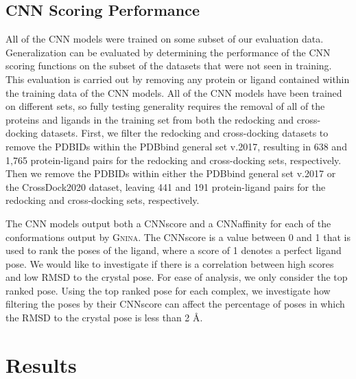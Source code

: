 \documentclass[journal=jcisd8,manuscript=article]{achemso}
\begin{document}
\subsection{CNN Scoring Performance}
All of the CNN models were trained on some subset of our evaluation data. Generalization can be evaluated by determining the performance of the CNN scoring functions on the subset of the datasets that were not seen in training. This evaluation is carried out by removing any protein or ligand contained within the training data of the CNN models. All of the CNN models have been trained on different sets, so fully testing generality requires the removal of all of the proteins and ligands in the training set from both the redocking and cross-docking datasets. First, we filter the redocking and cross-docking datasets to remove the PDBIDs within the PDBbind general set v.2017, resulting in 638 and 1,765 protein-ligand pairs for the redocking and cross-docking sets, respectively. Then we remove the PDBIDs within either the PDBbind general set v.2017 or the CrossDock2020 dataset\cite{francoeur2020three}, leaving 441 and 191 protein-ligand pairs for the redocking and cross-docking sets, respectively. 

The CNN models output both a CNNscore and a CNNaffinity for each of the conformations output by \textsc{Gnina}. The CNNscore is a value between 0 and 1 that is used to rank the poses of the ligand, where a score of 1 denotes a perfect ligand pose. We would like to investigate if there is a correlation between high scores and low RMSD to the crystal pose. For ease of analysis, we only consider the top ranked pose. Using the top ranked pose for each complex, we investigate how filtering the poses by their CNNscore can affect the percentage of poses in which the RMSD to the crystal pose is less than 2 \AA.

\section{Results}
\end{document}
